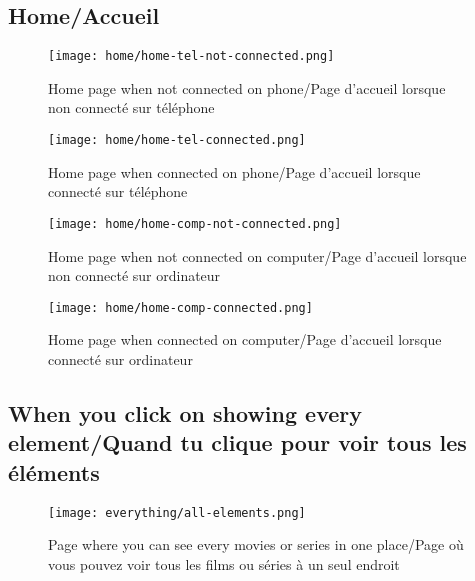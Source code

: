 \subsection{Home/Accueil}
\begin{figure}[ht]
    \centering
    \texttt{[image: home/home-tel-not-connected.png]}
    \caption{Home page when not connected on phone/Page d'accueil lorsque non connecté sur téléphone}
    \label{fig:home-tel-not-connected}
\end{figure}

\begin{figure}[ht]
    \centering
    \texttt{[image: home/home-tel-connected.png]}
    \caption{Home page when connected on phone/Page d'accueil lorsque connecté sur téléphone}
    \label{fig:home-tel-connected}
\end{figure}

\begin{sidewaysfigure}[ht]
    \centering
    \texttt{[image: home/home-comp-not-connected.png]}
    \caption{Home page when not connected on computer/Page d'accueil lorsque non connecté sur ordinateur}
    \label{fig:home-comp-not-connected}
\end{sidewaysfigure}

\begin{sidewaysfigure}[ht]
    \centering
    \texttt{[image: home/home-comp-connected.png]}
    \caption{Home page when connected on computer/Page d'accueil lorsque connecté sur ordinateur}
    \label{fig:home-comp-connected}
\end{sidewaysfigure}

\pagebreak

\subsection{When you click on showing every element/Quand tu clique pour voir tous les éléments}

\begin{sidewaysfigure}[ht]
    \centering
    \texttt{[image: everything/all-elements.png]}
    \caption{Page where you can see every movies or series in one place/Page où vous pouvez voir tous les films ou séries à un seul endroit}
    \label{fig:everything}
\end{sidewaysfigure}

